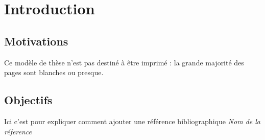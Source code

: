 \chapter{Introduction}
\label{chap:introduction}

\section{Motivations }
Ce modèle de thèse n'est pas destiné à être imprimé : la grande
majorité des pages sont blanches ou presque.

\section{Objectifs}

Ici c'est pour expliquer comment ajouter une référence bibliographique
\newline
\emph{Nom de la réference} \citep{machin} 


